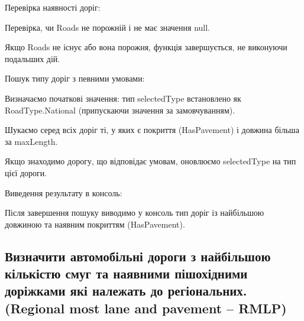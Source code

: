 \documentclass[14pt]{extarticle}
\begin{document}

\begin{fourthList}
\item Перевірка наявності доріг:
\begin{fourthList}
    
    \item Перевірка, чи Roads не порожній і не має значення null.
    \item Якщо Roads не існує або вона порожня, функція завершується, не виконуючи подальших дій.
\end{fourthList}

\item Пошук типу доріг з певними умовами:
\begin{fourthList}
    \item Визначаємо початкові значення: тип selectedType встановлено як RoadType.National (припускаючи значення за замовчуванням).
    \item Шукаємо серед всіх доріг ті, у яких є покриття (HasPavement) і довжина більша за maxLength.
    \item Якщо знаходимо дорогу, що відповідає умовам, оновлюємо selectedType на тип цієї дороги.
\end{fourthList}

\item Виведення результату в консоль:
\begin{fourthList}
    \item Після завершення пошуку виводимо у консоль тип доріг із найбільшою довжиною та наявним покриттям (HasPavement). 
\end{fourthList}

    
\end{fourthList}
\subsection{Визначити автомобільні дороги з найбільшою кількістю смуг та наявними пішохідними доріжками які належать до регіональних.(Regional most lane and pavement -- RMLP)}

\end{document}
